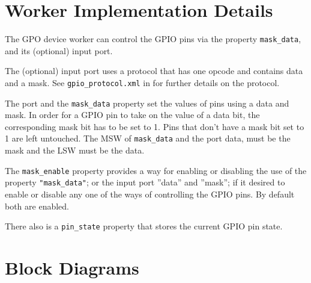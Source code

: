 \documentclass{article}
\begin{document}
\section*{Worker Implementation Details}
\begin{flushleft}

The GPO device worker can control the GPIO pins via the property \texttt{mask\_data}, and its (optional) input port. \newline

The (optional) input port uses a protocol that has one opcode and contains data and a mask. See \texttt{gpio\_protocol.xml} in   for further details on the protocol. \newline

The port and the \texttt{mask\_data} property set the values of pins using a
data and mask. In order for a GPIO pin to take on the value of a data bit,
the corresponding mask bit has to be set to 1. Pins that don't have a mask bit set to 1 are left untouched. The MSW of \texttt{mask\_data} and the port data, must be the mask and the LSW must be the data. \newline

The \texttt{mask\_enable} property provides a way for enabling or disabling the use of the property \texttt{"mask\_data"}; or the input port ”data” and ”mask”; if it desired to enable or disable any one of the ways of controlling the GPIO pins.
By default both are enabled. \newline

There also is a \texttt{pin\_state} property that stores the current GPIO pin state.

\end{flushleft}


\section*{Block Diagrams}
\end{document}
